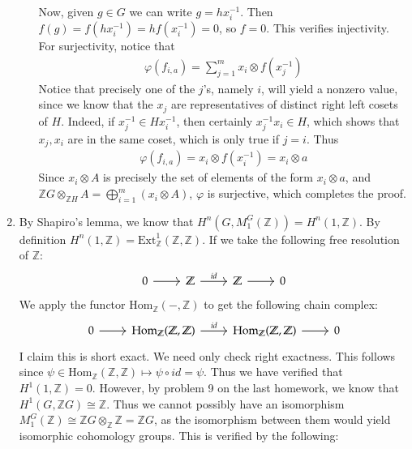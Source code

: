 \documentclass[12pt]{article}
\theoremstyle{definitionstyle}
\def\mbb#1{\mathbb{#1}}
\def\cph{\varphi}
\newcommand{\Z}{\mbb Z}
\newcommand{\Hom}{\mathrm{Hom}}
\begin{document}
\begin{enumerate}
\begin{enumerate}
            Now, given $g \in G$ we can write $g = hx_i^{-1}$. Then $f(g) = f(hx_i^{-1}) = hf(x_i^{-1}) = 0$, so $f = 0$. This verifies injectivity. For surjectivity, notice that
            \begin{align*}
                \cph(f_{i,a}) = \sum_{j=1}^m x_i \otimes f(x_j^{-1})
            \end{align*}
            Notice that precisely one of the $j$'s, namely $i$, will yield a nonzero value, since we know that the $x_j$ are representatives of distinct right left cosets of $H$. Indeed, if $x_j^{-1} \in Hx_i^{-1}$, then certainly $x_j^{-1} x_i \in H$, which shows that $x_j, x_i$ are in the same coset, which is only true if $j=i$. Thus 
            \begin{align*}
                \cph(f_{i,a}) = x_i \otimes f(x_i^{-1}) = x_i \otimes a
            \end{align*}
            Since $x_i \otimes A$ is precisely the set of elements of the form $x_i \otimes a$, and $\Z G \otimes_{\Z H} A = \bigoplus_{i=1}^m (x_i \otimes A)$, $\cph$ is surjective, which completes the proof.
        \end{enumerate}

        \item By Shapiro's lemma, we know that $H^n(G, M_1^G(\Z)) = H^n(1, \Z)$. By definition $H^n(1, \Z) = \mathrm{Ext}_{\Z}^1(\Z, \Z)$. If we take the following free resolution of $\Z$:
        \[\begin{tikzcd}
            0 & \Z & \Z & 0
            \arrow[from=1-1, to=1-2]
            \arrow["id", from=1-2, to=1-3]
            \arrow[from=1-3, to=1-4]
        \end{tikzcd}\]
        We apply the functor $\Hom_{\Z}(-, \Z)$ to get the following chain complex:
        \[\begin{tikzcd}
            0 & \Hom_{\Z}(\Z, \Z) & \Hom_{\Z}(\Z, \Z) & 0
            \arrow[from=1-1, to=1-2]
            \arrow["id", from=1-2, to=1-3]
            \arrow[from=1-3, to=1-4]
        \end{tikzcd}\]
        I claim this is short exact. We need only check right exactness. This follows since $\psi \in \Hom_\Z(\Z, \Z) \mapsto \psi \circ id = \psi$. Thus we have verified that $H^1(1, \Z) = 0$. However, by problem 9 on the last homework, we know that $H^1(G, \Z G) \cong \Z$. Thus we cannot possibly have an isomorphism $M_1^G(\Z) \cong \Z G \otimes_{\Z} \Z = \Z G$, as the isomorphism between them would yield isomorphic cohomology groups. This is verified by the following:
        

\end{enumerate}
\end{document}
